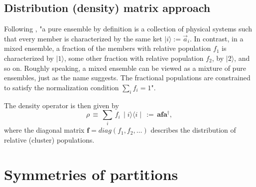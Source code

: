 \documentclass[twocolumn,aps,sort,nofootinbib]{revtex4}
\begin{document}
\subsection{Distribution (density) matrix approach}
Following \cite{Sakurai94}, "a pure ensemble by definition is a collection of physical systems
such that every member is characterized by the same ket $\mid i\rangle :=\overrightarrow{a}_i$.
In contrast, in a mixed ensemble, a fraction of the members with relative population $f_1$
is characterized by $\mid 1\rangle$, some other fraction with relative population $f_2$, by
$\mid 2\rangle$, and so on. Roughly speaking, a mixed ensemble can be viewed as a mixture of pure
ensembles, just as the name suggests. The fractional populations are constrained to satisfy the
normalization condition $\sum_i f_i = 1$".

The density operator is then given by
\begin{equation}
\rho\,\equiv\,\sum_i\,f_i\,\mid i\rangle\langle i\mid\,:=\,
\boldsymbol{a}\boldsymbol{f}\boldsymbol{a}^\dagger,
\end{equation}
where the diagonal matrix $\boldsymbol{f}=diag\left(f_1,f_2,\dots\right)$
describes the distribution of relative (cluster) populations.


\section{Symmetries of partitions}
\end{document}
